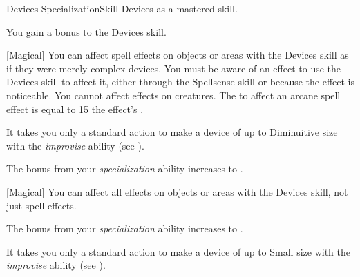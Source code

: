     \begin{feat}{Devices Specialization}{Skill}
        \featpre Devices as a mastered skill.

         You gain a  bonus to the Devices skill.

        [Magical] You can affect spell effects on objects or areas with the Devices skill as if they were merely complex devices.
        You must be aware of an effect to use the Devices skill to affect it, either through the Spellsense skill or because the effect is noticeable.
        You cannot affect effects on creatures.
        The  to affect an arcane spell effect is equal to 15 \add the effect's .

         It takes you only a standard action to make a device of up to Diminuitive size with the \textit{improvise} ability (see ).

         The bonus from your \textit{specialization} ability increases to .
        
        [Magical] You can affect all  effects on objects or areas with the Devices skill, not just spell effects.

         The bonus from your \textit{specialization} ability increases to .

         It takes you only a standard action to make a device of up to Small size with the \textit{improvise} ability (see ).
    \end{feat}

